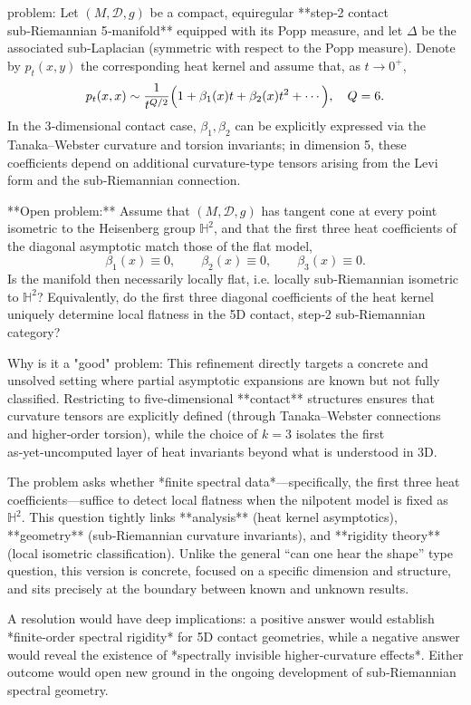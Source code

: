 problem:  
Let \((M,\mathcal{D},g)\) be a compact, equiregular **step‑2 contact sub‑Riemannian 5‑manifold** equipped with its Popp measure, and let \(\Delta\) be the associated sub‑Laplacian (symmetric with respect to the Popp measure). Denote by \(p_t(x,y)\) the corresponding heat kernel and assume that, as \(t\to 0^+\),  
\[
p_t(x,x)\sim \frac{1}{t^{Q/2}}\Bigl(1+\beta_1(x)t+\beta_2(x)t^2+\cdots\Bigr),\quad Q=6.
\]  
In the 3‑dimensional contact case, \(\beta_1,\beta_2\) can be explicitly expressed via the Tanaka–Webster curvature and torsion invariants; in dimension 5, these coefficients depend on additional curvature‑type tensors arising from the Levi form and the sub‑Riemannian connection.

**Open problem:**  
Assume that \((M,\mathcal{D},g)\) has tangent cone at every point isometric to the Heisenberg group \(\mathbb{H}^2\), and that the first three heat coefficients of the diagonal asymptotic match those of the flat model,  
\[
\beta_1(x)\equiv 0,\qquad \beta_2(x)\equiv 0,\qquad \beta_3(x)\equiv 0.
\]  
Is the manifold then necessarily locally flat, i.e. locally sub‑Riemannian isometric to \(\mathbb{H}^2\)?  
Equivalently, do the first three diagonal coefficients of the heat kernel uniquely determine local flatness in the 5D contact, step‑2 sub‑Riemannian category?

Why is it a "good" problem:  
This refinement directly targets a concrete and unsolved setting where partial asymptotic expansions are known but not fully classified. Restricting to five‑dimensional **contact** structures ensures that curvature tensors are explicitly defined (through Tanaka–Webster connections and higher‑order torsion), while the choice of \(k=3\) isolates the first as‑yet‑uncomputed layer of heat invariants beyond what is understood in 3D.  

The problem asks whether *finite spectral data*—specifically, the first three heat coefficients—suffice to detect local flatness when the nilpotent model is fixed as \(\mathbb{H}^2\). This question tightly links **analysis** (heat kernel asymptotics), **geometry** (sub‑Riemannian curvature invariants), and **rigidity theory** (local isometric classification). Unlike the general “can one hear the shape” type question, this version is concrete, focused on a specific dimension and structure, and sits precisely at the boundary between known and unknown results.  

A resolution would have deep implications: a positive answer would establish *finite‑order spectral rigidity* for 5D contact geometries, while a negative answer would reveal the existence of *spectrally invisible higher‑curvature effects*. Either outcome would open new ground in the ongoing development of sub‑Riemannian spectral geometry.